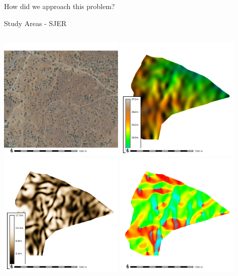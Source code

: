 \documentclass[
  ignorenonframetext,
]{beamer}
\begin{document}
\begin{frame}[fragile]{How did we approach this problem?}
\begin{block}{Study Areas - SJER}
\label{study-areas---sjer}
\begin{columns}[T]
\begin{column}{0.5\textwidth}
\includegraphics[width=0.45\textwidth,height=\textheight]{../output/SJER/naip.png}
\includegraphics[width=0.45\textwidth,height=\textheight]{../output/SJER/elev.png}
\includegraphics[width=0.45\textwidth,height=\textheight]{../output/SJER/slope.png}
\includegraphics[width=0.45\textwidth,height=\textheight]{../output/SJER/aspect.png}
\end{column}


\end{columns}
\end{block}
\end{frame}
\end{document}
